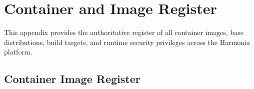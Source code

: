 
\chapter{Container and Image Register}
\label{app:container_register}

This appendix provides the authoritative register of all container images, base distributions, build targets, and runtime security privileges across the Harmonia platform.

\section{Container Image Register}

